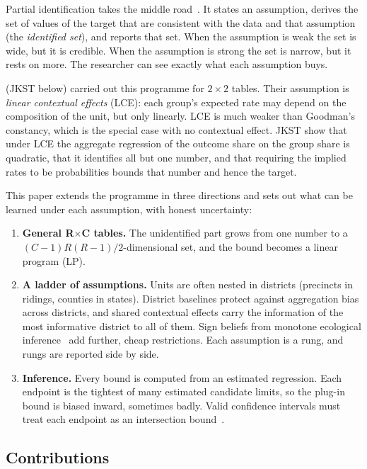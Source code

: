Partial identification takes the middle road~\citep{manski2003,tamer2010,molinari2020}.
It states an assumption, derives the set of values of the target that are
consistent with the data and that assumption (the \emph{identified set}), and
reports that set. When the assumption is weak the set is wide, but it is
credible. When the assumption is strong the set is narrow, but it rests on more.
The researcher can see exactly what each assumption buys.

\citet{jkst2019} (JKST below) carried out this programme for $2\times2$ tables.
Their assumption is \emph{linear contextual effects} (LCE): each group's
expected rate may depend on the composition of the unit, but only linearly. LCE
is much weaker than Goodman's constancy, which is the special case with no
contextual effect. JKST show that under LCE the aggregate regression of the
outcome share on the group share is quadratic, that it identifies all but one
number, and that requiring the implied rates to be probabilities bounds that
number and hence the target.

This paper extends the programme in three directions and sets out what can be
learned under each assumption, with honest uncertainty:
\begin{enumerate}
\item \textbf{General R$\times$C tables.} The unidentified part grows from one
number to a $(C-1)R(R-1)/2$-dimensional set, and the bound becomes a linear
program (LP).
\item \textbf{A ladder of assumptions.} Units are often nested in districts
(precincts in ridings, counties in states). District baselines protect against
aggregation bias across districts, and shared contextual effects carry the
information of the most informative district to all of them. Sign beliefs from
monotone ecological inference~\citep{egghm2025} add further, cheap restrictions.
Each assumption is a rung, and rungs are reported side by side.
\item \textbf{Inference.} Every bound is computed from an estimated regression.
Each endpoint is the tightest of many estimated candidate limits, so the
plug-in bound is biased inward, sometimes badly. Valid confidence intervals must
treat each endpoint as an intersection bound~\citep{clr2013}.
\end{enumerate}

\subsection{Contributions}

